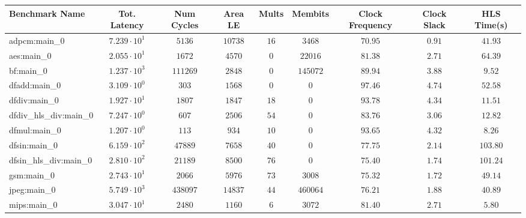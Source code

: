 \begin{tabular}{|l|c|c|c|c|c|c|c|c|}
\hline
Benchmark Name          & Tot. Latency           & Num Cycles & Area LE   & Mults   & Membits    & Clock Frequency & Clock Slack & HLS Time(s) \\
\hline
adpcm:main\_0           & $ 7.239 \cdot 10^{1} $ & $ 5136   $ & $ 10738 $ & $ 16  $ & $ 3468   $ & $ 70.95       $ & $ 0.91    $ & $ 41.93   $ \\
aes:main\_0             & $ 2.055 \cdot 10^{1} $ & $ 1672   $ & $ 4570  $ & $ 0   $ & $ 22016  $ & $ 81.38       $ & $ 2.71    $ & $ 64.39   $ \\
bf:main\_0              & $ 1.237 \cdot 10^{3} $ & $ 111269 $ & $ 2848  $ & $ 0   $ & $ 145072 $ & $ 89.94       $ & $ 3.88    $ & $ 9.52    $ \\
dfadd:main\_0           & $ 3.109 \cdot 10^{0} $ & $ 303    $ & $ 1568  $ & $ 0   $ & $ 0      $ & $ 97.46       $ & $ 4.74    $ & $ 52.58   $ \\
dfdiv:main\_0           & $ 1.927 \cdot 10^{1} $ & $ 1807   $ & $ 1847  $ & $ 18  $ & $ 0      $ & $ 93.78       $ & $ 4.34    $ & $ 11.51   $ \\
dfdiv\_hls\_div:main\_0 & $ 7.247 \cdot 10^{0} $ & $ 607    $ & $ 2506  $ & $ 54  $ & $ 0      $ & $ 83.76       $ & $ 3.06    $ & $ 12.82   $ \\
dfmul:main\_0           & $ 1.207 \cdot 10^{0} $ & $ 113    $ & $ 934   $ & $ 10  $ & $ 0      $ & $ 93.65       $ & $ 4.32    $ & $ 8.26    $ \\
dfsin:main\_0           & $ 6.159 \cdot 10^{2} $ & $ 47889  $ & $ 7658  $ & $ 40  $ & $ 0      $ & $ 77.75       $ & $ 2.14    $ & $ 103.80  $ \\
dfsin\_hls\_div:main\_0 & $ 2.810 \cdot 10^{2} $ & $ 21189  $ & $ 8500  $ & $ 76  $ & $ 0      $ & $ 75.40       $ & $ 1.74    $ & $ 101.24  $ \\
gsm:main\_0             & $ 2.743 \cdot 10^{1} $ & $ 2066   $ & $ 5976  $ & $ 73  $ & $ 3008   $ & $ 75.32       $ & $ 1.72    $ & $ 49.14   $ \\
jpeg:main\_0            & $ 5.749 \cdot 10^{3} $ & $ 438097 $ & $ 14837 $ & $ 44  $ & $ 460064 $ & $ 76.21       $ & $ 1.88    $ & $ 40.89   $ \\
mips:main\_0            & $ 3.047 \cdot 10^{1} $ & $ 2480   $ & $ 1160  $ & $ 6   $ & $ 3072   $ & $ 81.40       $ & $ 2.71    $ & $ 5.80    $ \\

\end{tabular}
